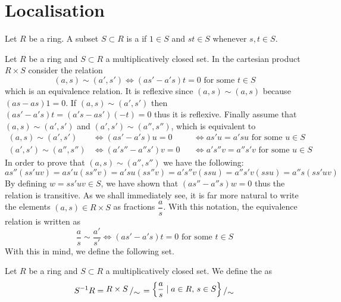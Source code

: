 
\section{Localisation}

\begin{definition}
	Let $R$ be a ring. A subset $S \subset R$ is a  if $1 \in S$ and $s t \in S$ whenever $s, t \in S$.
\end{definition}

Let $R$ be a ring and $S \subset R$ a multiplicatively closed set. In the cartesian product $R \times S$ consider the relation
\[
	(a,s) \sim (a',s') \iff (a s' - a' s) t = 0 \text{ for some } t \in S
\]
which is an equivalence relation. It is reflexive since $(a,s) \sim (a,s)$ because $(a s - a s) 1 = 0$. If $(a,s) \sim (a',s')$ then $(a s' - a' s) t = (a' s - a s')(-t) = 0$ thus it is reflexive. Finally assume that $(a,s) \sim (a',s')$ and $(a',s') \sim (a'',s'')$, which is equivalent to 
\[
	\begin{aligned}
		(a,s) \sim (a',s') 
		&\iff (a s' - a' s) u = 0  
		&
		&\iff a s' u = a' s u \text{ for some } u \in S \\
		(a',s') \sim (a'',s'')
		&\iff (a' s'' - a'' s') v = 0 
		&
		&\iff a' s'' v = a'' s' v \text{ for some } u \in S 
	\end{aligned}
\]
In order to prove that $(a,s) \sim (a'',s'')$ we have the following:
\[
	a s'' (s s' u v) = 
	a s' u (s s'' v) = 
	a' s u (s s'' v) = 
	a' s'' v (s s u) = 
	a'' s' v (s s u) = 
	a'' s (s s' u v)
\]
By defining $w = s s' u v \in S$, we have shown that $(a s'' - a'' s) w = 0$ thus the relation is transitive. As we shall immediately see, it is far more natural to write the elements $(a,s) \in  R \times S$ as fractions $\dfrac{a}{s}$. With this notation, the equivalence relation is written as  
\[
	\frac{a}{s} \sim \frac{a'}{s'} \iff (a s' - a' s) t = 0 \text{ for some } t \in S
\]
With this in mind, we define the following set.

\begin{definition}
	Let $R$ be a ring and $S \subset R$ a multiplicatively closed set. We define the  as
	\[
		S^{-1} R = 
		\quotient{R \times S}{\sim} = 
		\quotient{\left\{ \dfrac{a}{s} \mid a \in R, \, s \in S\right\}}{\sim}
	\]
\end{definition}

